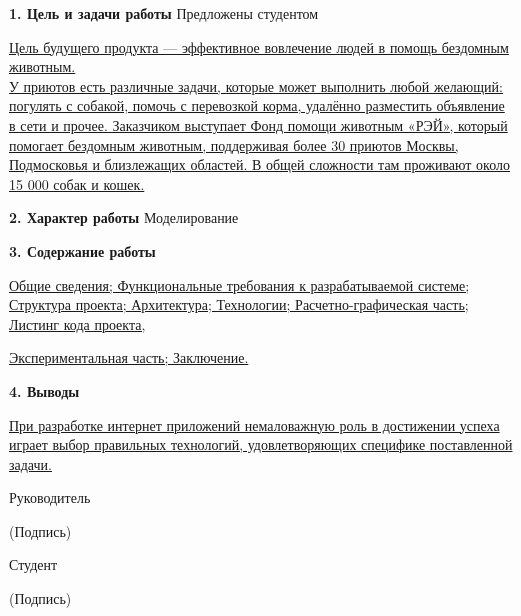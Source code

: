 \documentclass[12pt]{article}
\begin{document}
 \noindent \textbf{1. Цель и задачи работы} \hspace{110pt} Предложены студентом
 
 \bigskip
 
\uline{Цель будущего продукта --- эффективное вовлечение людей в помощь бездомным животным.\hspace*{\fill}}\\ \uline{У приютов есть различные задачи, которые может выполнить любой желающий: погулять с собакой, помочь с перевозкой корма, удалённо разместить объявление в сети и прочее. Заказчиком выступает Фонд помощи животным «РЭЙ», который помогает бездомным животным, поддерживая более 30 приютов Москвы, Подмосковья и близлежащих областей. В общей сложности там проживают около 15 000 собак и кошек. \hspace*{\fill}}

\bigskip
 \noindent \textbf{2. Характер работы} \hspace{140pt} Моделирование
\bigskip
 
 \noindent \textbf{3. Содержание работы}
 
 \bigskip
 
\uline{Общие сведения; Функциональные требования к разрабатываемой системе; Структура проекта; Архитектура; Технологии; Расчетно-графическая часть; Листинг кода проекта,\hspace*{\fill}}

\noindent \uline{Экспериментальная часть; Заключение.  \hspace*{\fill}}

\bigskip

 \noindent \textbf{4. Выводы}
 
 \bigskip
 
\uline{При разработке интернет приложений немаловажную роль в достижении успеха играет выбор правильных технологий, удовлетворяющих специфике поставленной задачи.\hspace*{\fill}}

\bigskip
\normalsize \noindent Руководитель \hrulefill

\hspace{8cm} \scriptsize (Подпись) 

\normalsize

\bigskip
\normalsize \noindent Студент \hrulefill

\hspace{8cm} \scriptsize  (Подпись) 

\normalsize

\bigskip
\end{document}
